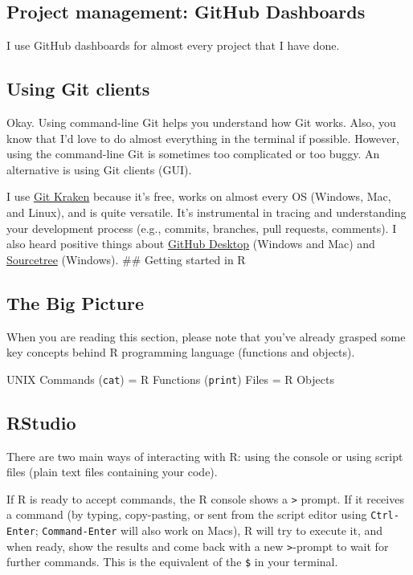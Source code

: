 \documentclass[
]{book}
\begin{document}
\hypertarget{project-management-github-dashboards}{%
\subsection{Project management: GitHub Dashboards}\label{project-management-github-dashboards}}

I use GitHub dashboards for almost every project that I have done.

\hypertarget{using-git-clients}{%
\subsection{Using Git clients}\label{using-git-clients}}

Okay. Using command-line Git helps you understand how Git works. Also, you know that I'd love to do almost everything in the terminal if possible. However, using the command-line Git is sometimes too complicated or too buggy. An alternative is using Git clients (GUI).

I use \href{https://www.gitkraken.com/}{Git Kraken} because it's free, works on almost every OS (Windows, Mac, and Linux), and is quite versatile. It's instrumental in tracing and understanding your development process (e.g., commits, branches, pull requests, comments). I also heard positive things about \href{https://desktop.github.com/}{GitHub Desktop} (Windows and Mac) and \href{https://www.sourcetreeapp.com/}{Sourcetree} (Windows).
\#\# Getting started in R

\hypertarget{the-big-picture-2}{%
\subsection{The Big Picture}\label{the-big-picture-2}}

When you are reading this section, please note that you've already grasped some key concepts behind R programming language (functions and objects).

UNIX Commands (\texttt{cat}) = R Functions (\texttt{print})
Files = R Objects

\hypertarget{rstudio}{%
\subsection{RStudio}\label{rstudio}}

There are two main ways of interacting with R: using the console or using script files (plain text files containing your code).

If R is ready to accept commands, the R console shows a \texttt{\textgreater{}} prompt. If it receives a command (by typing, copy-pasting, or sent from the script editor using \texttt{Ctrl-Enter}; \texttt{Command-Enter} will also work on Macs), R will try to execute it, and when ready, show the results and come back with a new \texttt{\textgreater{}}-prompt to wait for further commands. This is the equivalent of the \texttt{\$} in your terminal.
\end{document}
